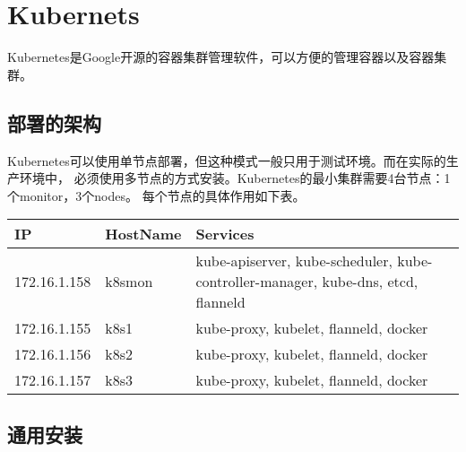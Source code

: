 \chapter{Kubernets}
Kubernetes是Google开源的容器集群管理软件，可以方便的管理容器以及容器集群。

\section{部署的架构}
Kubernetes可以使用单节点部署，但这种模式一般只用于测试环境。而在实际的生产环境中，
必须使用多节点的方式安装。Kubernetes的最小集群需要4台节点：1个monitor，3个nodes。
每个节点的具体作用如下表。
\begin{center}
  \begin{tabularx}{\textwidth}{|l|l|X|}
  \hline
  IP & HostName & Services\\ \hline
  172.16.1.158 & k8smon & kube-apiserver, kube-scheduler, kube-controller-manager, kube-dns, etcd, flanneld\\
  172.16.1.155 & k8s1 & kube-proxy, kubelet, flanneld, docker \\
  172.16.1.156 & k8s2 & kube-proxy, kubelet, flanneld, docker \\
  172.16.1.157 & k8s3 & kube-proxy, kubelet, flanneld, docker \\
  \hline
  \end{tabularx}
  \label{tab:k8s_service_mapping}
\end{center}

\section{通用安装}

